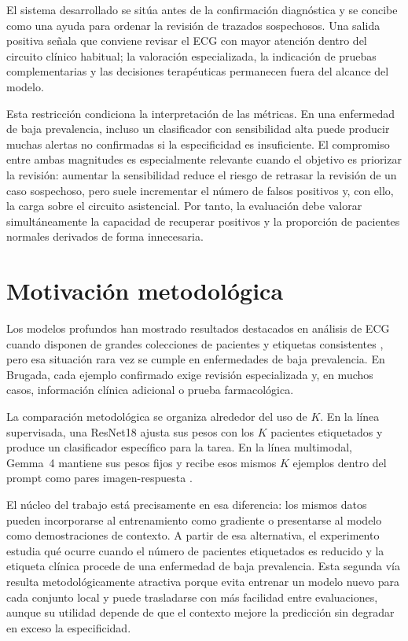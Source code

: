 El sistema desarrollado se sitúa antes de la confirmación diagnóstica y se concibe como una ayuda para ordenar la revisión de trazados sospechosos. Una salida positiva señala que conviene revisar el ECG con mayor atención dentro del circuito clínico habitual; la valoración especializada, la indicación de pruebas complementarias y las decisiones terapéuticas permanecen fuera del alcance del modelo.

Esta restricción condiciona la interpretación de las métricas. En una enfermedad de baja prevalencia, incluso un clasificador con sensibilidad alta puede producir muchas alertas no confirmadas si la especificidad es insuficiente. El compromiso entre ambas magnitudes es especialmente relevante cuando el objetivo es priorizar la revisión: aumentar la sensibilidad reduce el riesgo de retrasar la revisión de un caso sospechoso, pero suele incrementar el número de falsos positivos y, con ello, la carga sobre el circuito asistencial. Por tanto, la evaluación debe valorar simultáneamente la capacidad de recuperar positivos y la proporción de pacientes normales derivados de forma innecesaria.

\section{Motivación metodológica}

Los modelos profundos han mostrado resultados destacados en análisis de ECG cuando disponen de grandes colecciones de pacientes y etiquetas consistentes \cite{ribeiro2020,sangha2022}, pero esa situación rara vez se cumple en enfermedades de baja prevalencia. En Brugada, cada ejemplo confirmado exige revisión especializada y, en muchos casos, información clínica adicional o prueba farmacológica.

La comparación metodológica se organiza alrededor del uso de \(K\). En la línea supervisada, una ResNet18 ajusta sus pesos con los \(K\) pacientes etiquetados y produce un clasificador específico para la tarea. En la línea multimodal, Gemma~4 mantiene sus pesos fijos y recibe esos mismos \(K\) ejemplos dentro del prompt como pares imagen-respuesta \cite{gemma4card}.

El núcleo del trabajo está precisamente en esa diferencia: los mismos datos pueden incorporarse al entrenamiento como gradiente o presentarse al modelo como demostraciones de contexto. A partir de esa alternativa, el experimento estudia qué ocurre cuando el número de pacientes etiquetados es reducido y la etiqueta clínica procede de una enfermedad de baja prevalencia. Esta segunda vía resulta metodológicamente atractiva porque evita entrenar un modelo nuevo para cada conjunto local y puede trasladarse con más facilidad entre evaluaciones, aunque su utilidad depende de que el contexto mejore la predicción sin degradar en exceso la especificidad.

